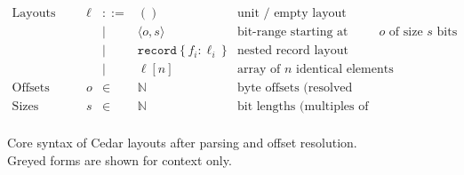 \begin{figure}[h]
\[
\begin{array}{llclr}
  \textrm{Layouts (core syntax)} 
     & \ell & ::=  & () & \textrm{unit / empty layout} \\
     &       & \mid & \langle o, s \rangle & \textrm{bit-range starting at offset $o$ of size $s$ bits} \\
     &       & \mid & \texttt{record}\ \{\, f_i : \ell_i \,\} & \textrm{nested record layout} \\
     &       & \mid & \ell [n] & \textrm{array of $n$ identical elements} \\
  \textrm{Offsets} & o & \in & \mathbb{N} & \textrm{byte offsets (resolved statically)} \\
  \textrm{Sizes}   & s & \in & \mathbb{N} & \textrm{bit lengths (multiples of 8)} \\
\end{array}
\]
\caption{Core syntax of Cedar layouts after parsing and offset resolution. Greyed forms are shown for context only.}
\label{fig:cedar-core}
\end{figure}
